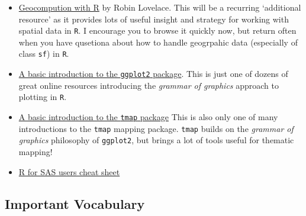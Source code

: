 \documentclass[
]{book}
\providecommand{\tightlist}{%
  \setlength{\itemsep}{0pt}\setlength{\parskip}{0pt}}
\begin{document}
\begin{itemize}
\tightlist
\item
  \href{https://geocompr.robinlovelace.net/}{Geocompution with R} by Robin Lovelace. This will be a recurring `additional resource' as it provides lots of useful insight and strategy for working with spatial data in \texttt{R}. I encourage you to browse it quickly now, but return often when you have qusetiona about how to handle geogrpahic data (especially of class \texttt{sf}) in \texttt{R}.
\item
  \href{https://bookdown.org/agrogankaylor/quick-intro-to-ggplot2/quick-intro-to-ggplot2.html}{A basic introduction to the \texttt{ggplot2} package}. This is just one of dozens of great online resources introducing the \emph{grammar of graphics} approach to plotting in \texttt{R}.
\item
  \href{https://tlorusso.github.io/geodata_workshop/tmap_package\#:~:text=The\%20tmap\%20package\%20is\%20a,as\%20choropleths\%20and\%20bubble\%20maps.}{A basic introduction to the \texttt{tmap} package} This is also only one of many introductions to the \texttt{tmap} mapping package. \texttt{tmap} builds on the \emph{grammar of graphics} philosophy of \texttt{ggplot2}, but brings a lot of tools useful for thematic mapping!
\item
  \href{https://github.com/rstudio/cheatsheets/raw/master/sas-r.pdf}{R for SAS users cheat sheet}
\end{itemize}

\hypertarget{important-vocabulary}{%
\subsection{Important Vocabulary}\label{important-vocabulary}}

 
  \providecommand{\huxb}[2]{\arrayrulecolor[RGB]{#1}\global\arrayrulewidth=#2pt}
  \providecommand{\huxvb}[2]{\color[RGB]{#1}\vrule width #2pt}
  \providecommand{\huxtpad}[1]{\rule{0pt}{#1}}
  \providecommand{\huxbpad}[1]{\rule[-#1]{0pt}{#1}}
\end{document}
